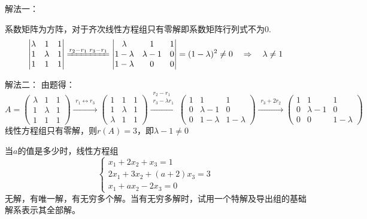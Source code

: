 \documentclass[a4paper]{report}
\begin{document}
\begin{jie}
解法一：

系数矩阵为方阵，对于齐次线性方程组只有零解即系数矩阵行列式不为0.
\begin{equation*}
\begin{vmatrix}
\lambda&1&1\\
1&\lambda&1\\
1&1&1
\end{vmatrix}\xlongequal{r_2-r_1\\ r_3-r_1}
\begin{vmatrix}
\lambda&1&1\\
1-\lambda&\lambda-1&0\\
1-\lambda&0&0
\end{vmatrix}=(1-\lambda)^2\neq 0~~~\Rightarrow~~~\lambda\neq1
\end{equation*}


解法二：
由题得：
\begin{equation*}
A=
\begin{pmatrix}
\lambda&1&1\\
1&\lambda&1\\
1&1&1
\end{pmatrix}
\xrightarrow{\substack{r_1\leftrightarrow r_3}}
{
\begin{pmatrix}
1&1&1\\
1&\lambda&1\\
\lambda&1&1
\end{pmatrix}
}\xrightarrow{\substack{r_2-r_1\\ r_3-\lambda r_1}}
{
\begin{pmatrix}
1&1&1\\
0&\lambda-1&0\\
0&1-\lambda&1-\lambda
\end{pmatrix}
}\xrightarrow{\substack{r_3+2r_2}}
{
\begin{pmatrix}
1&1&1\\
0&\lambda-1&0\\
0&0&1-\lambda
\end{pmatrix}
}
\end{equation*}
线性方程组只有零解，则$r(A)=3$，即$\lambda-1\neq 0$
\end{jie}

\EX 当$a$的值是多少时，线性方程组
\begin{equation*}
\begin{cases}
x_1+2x_2+x_3=1\\
2x_1+3x_2+(a+2)x_3=3\\
x_1+ax_2-2x_3=0
\end{cases}
\end{equation*}
无解，有唯一解，有无穷多个解。当有无穷多解时，试用一个特解及导出组的基础解系表示其全部解。
\end{document}
